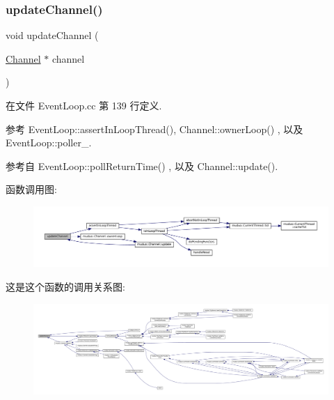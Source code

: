 \subsubsection{\texorpdfstring{update\+Channel()}{updateChannel()}}
{\footnotesize\ttfamily void update\+Channel (\begin{DoxyParamCaption}\item[{\hyperlink{classmuduo_1_1Channel}{Channel} $\ast$}]{channel }\end{DoxyParamCaption})}



在文件 Event\+Loop.\+cc 第 139 行定义.



参考 Event\+Loop\+::assert\+In\+Loop\+Thread(), Channel\+::owner\+Loop() , 以及 Event\+Loop\+::poller\+\_\+.



参考自 Event\+Loop\+::poll\+Return\+Time() , 以及 Channel\+::update().

函数调用图\+:
\nopagebreak
\begin{figure}[H]
\begin{center}
\leavevmode
\includegraphics[width=350pt]{classmuduo_1_1EventLoop_acaa4a191936aacf608d279a6f343d533_cgraph}
\end{center}
\end{figure}
这是这个函数的调用关系图\+:
\nopagebreak
\begin{figure}[H]
\begin{center}
\leavevmode
\includegraphics[width=350pt]{classmuduo_1_1EventLoop_acaa4a191936aacf608d279a6f343d533_icgraph}
\end{center}
\end{figure}
\mbox{\label{classmuduo_1_1EventLoop_ae674290a26ecbd622c5160e38e8a4fe9}} 
